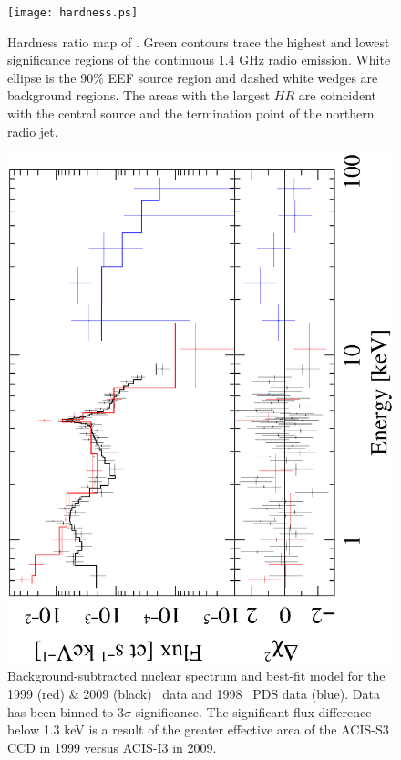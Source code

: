 \begin{figure}
  \begin{center}
    \begin{minipage}{0.5\linewidth}
      \texttt{[image: hardness.ps]}
    \end{minipage}
    \caption{Hardness ratio map of \irs. Green contours trace the
      highest and lowest significance regions of the continuous 1.4
      GHz radio emission. White ellipse is the 90\% EEF source region
      and dashed white wedges are background regions. The areas with
      the largest $HR$ are coincident with the central source and the
      termination point of the northern radio jet.}
    \label{fig:hardness}
  \end{center}
\end{figure}

\begin{figure}
  \begin{center}
    \begin{minipage}{\linewidth}
      \includegraphics*[angle=270, width=\textwidth, trim=0mm 20mm 0mm 0mm, clip]{nuc.ps}
    \end{minipage}
    \vspace{0.25cm}
    \caption{Background-subtracted nuclear spectrum and best-fit model
      for the 1999 (red) \& 2009 (black) \cxo\ data and 1998
      \bepposax\ PDS data (blue). Data has been binned to $3\sigma$
      significance. The significant flux difference below 1.3 keV is a
      result of the greater effective area of the ACIS-S3 CCD in 1999
      versus ACIS-I3 in 2009.}
    \label{fig:nucspec}
  \end{center}
\end{figure}

